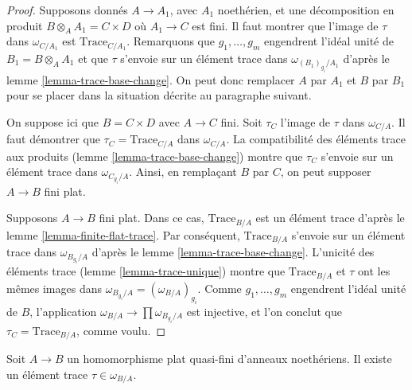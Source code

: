 \begin{proof}
Supposons donnés $A \to A_1$, avec $A_1$ noethérien, et une décomposition
en produit $B \otimes_A A_1 = C \times D$ où $A_1 \to C$ est fini.
Il faut montrer que l'image de $\tau$ dans $\omega_{C/A_1}$ est
$\text{Trace}_{C/A_1}$. Remarquons que $g_1, \ldots, g_m$
engendrent l'idéal unité de $B_1 = B \otimes_A A_1$ et que
$\tau$ s'envoie sur un élément trace dans $\omega_{(B_1)_{g_i}/A_1}$
d'après le lemme \ref{lemma-trace-base-change}. On peut donc remplacer
$A$ par $A_1$ et $B$ par $B_1$ pour se placer dans la situation décrite
au paragraphe suivant.

\medskip\noindent
On suppose ici que $B = C \times D$ avec $A \to C$ fini.
Soit $\tau_C$ l'image de $\tau$ dans $\omega_{C/A}$.
Il faut démontrer que $\tau_C = \text{Trace}_{C/A}$ dans $\omega_{C/A}$.
La compatibilité des éléments trace aux produits
(lemme \ref{lemma-trace-base-change})
montre que $\tau_C$ s'envoie sur un élément trace dans $\omega_{C_{g_i}/A}$.
Ainsi, en remplaçant $B$ par $C$, on peut supposer $A \to B$
fini plat.

\medskip\noindent
Supposons $A \to B$ fini plat. Dans ce cas, $\text{Trace}_{B/A}$
est un élément trace d'après le lemme \ref{lemma-finite-flat-trace}.
Par conséquent, $\text{Trace}_{B/A}$ s'envoie sur un élément trace dans
$\omega_{B_{g_i}/A}$ d'après le lemme \ref{lemma-trace-base-change}.
L'unicité des éléments trace (lemme \ref{lemma-trace-unique})
montre que $\text{Trace}_{B/A}$ et $\tau$ ont
les mêmes images dans $\omega_{B_{g_i}/A} = (\omega_{B/A})_{g_i}$.
Comme $g_1, \ldots, g_m$ engendrent l'idéal unité de $B$, l'application
$\omega_{B/A} \to \prod \omega_{B_{g_i}/A}$ est injective,
et l'on conclut que $\tau_C = \text{Trace}_{B/A}$, comme voulu.
\end{proof}

\begin{lemma}
\label{lemma-dualizing-tau}
Soit $A \to B$ un homomorphisme plat quasi-fini d'anneaux noethériens.
Il existe un élément trace $\tau \in \omega_{B/A}$.
\end{lemma}

